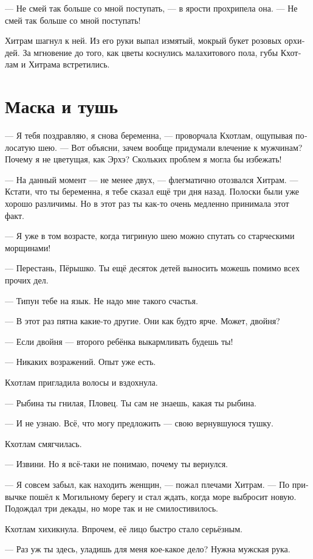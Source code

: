 \documentclass[a4paper,12pt,fleqn]{book}\usepackage{polyglossia}\setdefaultlanguage[babelshorthands=true]{russian}\setotherlanguage{english}\defaultfontfeatures{Ligatures=TeX,Mapping=tex-text}\usepackage{xcolor}\newcommand{\ml}[3]{#2}
\begin{document}
--- Не смей так больше со мной поступать, --- в ярости прохрипела она.
--- Не смей так больше со мной поступать!

Хитрам шагнул к ней.
Из его руки выпал измятый, мокрый букет розовых орхидей.
За мгновение до того, как цветы коснулись малахитового пола, губы Кхотлам и Хитрама встретились.

\chapter{Маска и тушь}

--- Я тебя поздравляю, я снова беременна, --- проворчала Кхотлам, ощупывая полосатую шею.
--- Вот объясни, зачем вообще придумали влечение к мужчинам?
Почему я не цветущая, как Эрхэ?
Скольких проблем я могла бы избежать!

--- На данный момент --- не менее двух, --- флегматично отозвался Хитрам.
--- Кстати, что ты беременна, я тебе сказал ещё три дня назад.
Полоски были уже хорошо различимы.
Но в этот раз ты как-то очень медленно принимала этот факт.

--- Я уже в том возрасте, когда тигриную шею можно спутать со старческими морщинами!

--- Перестань, Пёрышко.
Ты ещё десяток детей выносить можешь помимо всех прочих дел.

--- Типун тебе на язык.
Не надо мне такого счастья.

--- В этот раз пятна какие-то другие.
Они как будто ярче.
Может, двойня?

--- Если двойня --- второго ребёнка выкармливать будешь ты!

--- Никаких возражений.
Опыт уже есть.

Кхотлам пригладила волосы и вздохнула.

--- Рыбина ты гнилая, Пловец.
Ты сам не знаешь, какая ты рыбина.

--- И не узнаю.
Всё, что могу предложить --- свою вернувшуюся тушку.

Кхотлам смягчилась.

--- Извини.
Но я всё-таки не понимаю, почему ты вернулся.

--- Я совсем забыл, как находить женщин, --- пожал плечами Хитрам.
--- По привычке пошёл к Могильному берегу и стал ждать, когда море выбросит новую.
Подождал три декады, но море так и не смилостивилось.

Кхотлам хихикнула.
Впрочем, её лицо быстро стало серьёзным.

--- Раз уж ты здесь, уладишь для меня кое-какое дело?
Нужна мужская рука.
\end{document}
